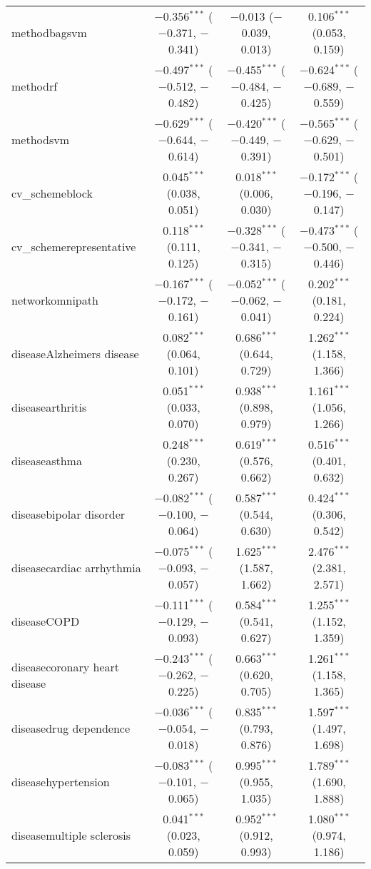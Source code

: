 \begin{table}[!htbp]
\begin{tabular}{@{\extracolsep{5pt}}lccc}
  methodbagsvm & $-$0.356$^{***}$ ($-$0.371, $-$0.341) & $-$0.013 ($-$0.039, 0.013) & 0.106$^{***}$ (0.053, 0.159) \\ 
  methodrf & $-$0.497$^{***}$ ($-$0.512, $-$0.482) & $-$0.455$^{***}$ ($-$0.484, $-$0.425) & $-$0.624$^{***}$ ($-$0.689, $-$0.559) \\ 
  methodsvm & $-$0.629$^{***}$ ($-$0.644, $-$0.614) & $-$0.420$^{***}$ ($-$0.449, $-$0.391) & $-$0.565$^{***}$ ($-$0.629, $-$0.501) \\ 
  cv\_schemeblock & 0.045$^{***}$ (0.038, 0.051) & 0.018$^{***}$ (0.006, 0.030) & $-$0.172$^{***}$ ($-$0.196, $-$0.147) \\ 
  cv\_schemerepresentative & 0.118$^{***}$ (0.111, 0.125) & $-$0.328$^{***}$ ($-$0.341, $-$0.315) & $-$0.473$^{***}$ ($-$0.500, $-$0.446) \\ 
  networkomnipath & $-$0.167$^{***}$ ($-$0.172, $-$0.161) & $-$0.052$^{***}$ ($-$0.062, $-$0.041) & 0.202$^{***}$ (0.181, 0.224) \\ 
  diseaseAlzheimers disease & 0.082$^{***}$ (0.064, 0.101) & 0.686$^{***}$ (0.644, 0.729) & 1.262$^{***}$ (1.158, 1.366) \\ 
  diseasearthritis & 0.051$^{***}$ (0.033, 0.070) & 0.938$^{***}$ (0.898, 0.979) & 1.161$^{***}$ (1.056, 1.266) \\ 
  diseaseasthma & 0.248$^{***}$ (0.230, 0.267) & 0.619$^{***}$ (0.576, 0.662) & 0.516$^{***}$ (0.401, 0.632) \\ 
  diseasebipolar disorder & $-$0.082$^{***}$ ($-$0.100, $-$0.064) & 0.587$^{***}$ (0.544, 0.630) & 0.424$^{***}$ (0.306, 0.542) \\ 
  diseasecardiac arrhythmia & $-$0.075$^{***}$ ($-$0.093, $-$0.057) & 1.625$^{***}$ (1.587, 1.662) & 2.476$^{***}$ (2.381, 2.571) \\ 
  diseaseCOPD & $-$0.111$^{***}$ ($-$0.129, $-$0.093) & 0.584$^{***}$ (0.541, 0.627) & 1.255$^{***}$ (1.152, 1.359) \\ 
  diseasecoronary heart disease & $-$0.243$^{***}$ ($-$0.262, $-$0.225) & 0.663$^{***}$ (0.620, 0.705) & 1.261$^{***}$ (1.158, 1.365) \\ 
  diseasedrug dependence & $-$0.036$^{***}$ ($-$0.054, $-$0.018) & 0.835$^{***}$ (0.793, 0.876) & 1.597$^{***}$ (1.497, 1.698) \\ 
  diseasehypertension & $-$0.083$^{***}$ ($-$0.101, $-$0.065) & 0.995$^{***}$ (0.955, 1.035) & 1.789$^{***}$ (1.690, 1.888) \\ 
  diseasemultiple sclerosis & 0.041$^{***}$ (0.023, 0.059) & 0.952$^{***}$ (0.912, 0.993) & 1.080$^{***}$ (0.974, 1.186) \\ 

\end{tabular}
\end{table}
